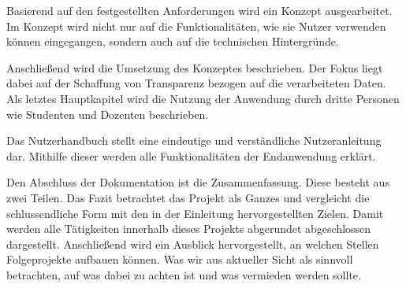 Basierend auf den festgestellten Anforderungen wird ein Konzept ausgearbeitet.
Im Konzept wird nicht nur auf die Funktionalitäten, wie sie Nutzer verwenden können eingegangen, sondern auch auf die technischen Hintergründe.

Anschließend wird die Umsetzung des Konzeptes beschrieben.
Der Fokus liegt dabei auf der Schaffung von Transparenz bezogen auf die verarbeiteten Daten.
Als letztes Hauptkapitel wird die Nutzung der Anwendung durch dritte Personen wie Studenten und Dozenten beschrieben.

Das Nutzerhandbuch stellt eine eindeutige und verständliche Nutzeranleitung dar.
Mithilfe dieser werden alle Funktionalitäten der Endanwendung erklärt.

Den Abschluss der Dokumentation ist die Zusammenfassung.
Diese besteht aus zwei Teilen.
Das Fazit betrachtet das Projekt als Ganzes und vergleicht die schlussendliche Form mit den in der Einleitung hervorgestellten Zielen. Damit werden alle Tätigkeiten innerhalb dieses Projekts abgerundet abgeschlossen dargestellt.
Anschließend wird ein Ausblick hervorgestellt, an welchen Stellen Folgeprojekte aufbauen können. Was wir aus aktueller Sicht als sinnvoll betrachten, auf was dabei zu achten ist und was vermieden werden sollte.



\clearpage
